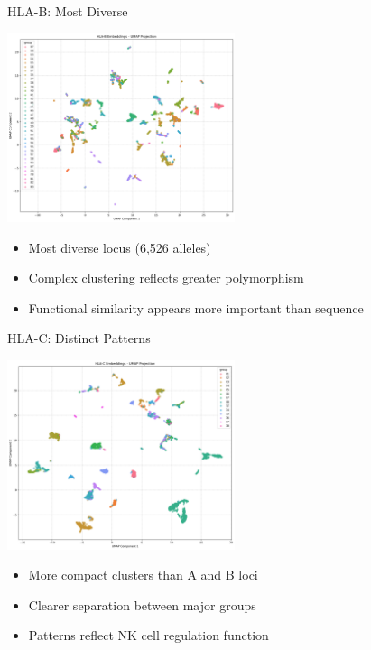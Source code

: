 \documentclass[aspectratio=169]{beamer}
\begin{document}
\begin{frame}{HLA-B: Most Diverse}
  \begin{center}
    \includegraphics[width=0.5\textwidth]{data/analysis/locus_embeddings/class1/plots/hla_B_umap.png}
  \end{center}
  
  \begin{itemize}\small
    \item Most diverse locus (6,526 alleles)
    \item Complex clustering reflects greater polymorphism
    \item Functional similarity appears more important than sequence
  \end{itemize}
\end{frame}

\begin{frame}{HLA-C: Distinct Patterns}
  \begin{center}
    \includegraphics[width=0.5\textwidth]{data/analysis/locus_embeddings/class1/plots/hla_C_umap.png}
  \end{center}
  
  \begin{itemize}\small
    \item More compact clusters than A and B loci
    \item Clearer separation between major groups
    \item Patterns reflect NK cell regulation function
  \end{itemize}
\end{frame}
\end{document}
